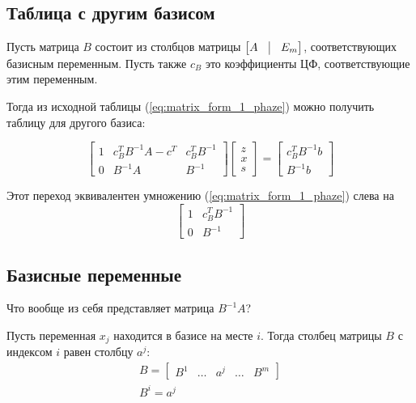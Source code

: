 \documentclass[a4paper,article,14pt]{extarticle}
\begin{document}
\subsection{Таблица с другим базисом}

Пусть матрица \(B\) состоит из столбцов матрицы \(
    \begin{bmatrix}
        A & \vline & E_m
    \end{bmatrix}
\), соответствующих базисным переменным.
Пусть также \(c_B\) это коэффициенты ЦФ, соответствующие этим переменным.

Тогда из исходной таблицы (\ref{eq:matrix_form_1_phaze}) можно получить таблицу для другого базиса:

\begin{equation} \label{eq:matrix_form_1_phaze_basis}
    \begin{bmatrix}
        1 & c_B^TB^{-1}A-c^T & c_B^TB^{-1} \\
        0 & B^{-1}A & B^{-1}
    \end{bmatrix}
    \begin{bmatrix}
        z \\ x \\ s
    \end{bmatrix}
    =
    \begin{bmatrix}
        c_B^TB^{-1}b \\ B^{-1}b
    \end{bmatrix}
\end{equation}

Этот переход эквивалентен умножению (\ref{eq:matrix_form_1_phaze}) слева на
\begin{equation}
    \begin{bmatrix}
        1 & c_B^TB^{-1} \\
        0 & B^{-1}
    \end{bmatrix}
\end{equation}

\subsection{Базисные переменные}

Что вообще из себя представляет матрица \(B^{-1}A\)?

Пусть переменная \(x_j\) находится в базисе на месте \(i\).
Тогда столбец матрицы \(B\) с индексом \(i\) равен столбцу \(a^j\):
\begin{equation}
    \begin{gathered}
        B = \begin{bmatrix}
            B^1 & \ldots & a^j & \ldots & B^m
        \end{bmatrix} \\
        B^i = a^j
    \end{gathered}
\end{equation}
\end{document}
